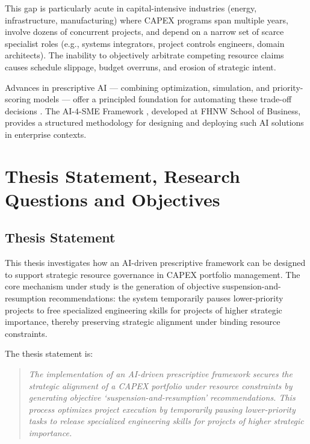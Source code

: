 This gap is particularly acute in capital-intensive industries (energy, infrastructure,
manufacturing) where CAPEX programs span multiple years, involve dozens of concurrent projects,
and depend on a narrow set of scarce specialist roles (e.g., systems integrators, project
controls engineers, domain architects). The inability to objectively arbitrate competing resource
claims causes schedule slippage, budget overruns, and erosion of strategic intent.

Advances in prescriptive AI — combining optimization, simulation, and priority-scoring models —
offer a principled foundation for automating these trade-off decisions \parencite{gartner2024hype}.
The AI-4-SME Framework \parencite{peter2025ai4sme}, developed at FHNW School of Business, provides a
structured methodology for designing and deploying such AI solutions in enterprise contexts.

\section{Thesis Statement, Research Questions and Objectives}
\label{sec:thesis_rq_objectives}

\subsection*{Thesis Statement}

This thesis investigates how an AI-driven prescriptive framework can be designed to support
strategic resource governance in CAPEX portfolio management. The core mechanism under study is
the generation of objective suspension-and-resumption recommendations: the system temporarily
pauses lower-priority projects to free specialized engineering skills for projects of higher
strategic importance, thereby preserving strategic alignment under binding resource constraints.

The thesis statement is:
\begin{quote}
  \textit{The implementation of an AI-driven prescriptive framework secures the strategic
  alignment of a CAPEX portfolio under resource constraints by generating objective
  `suspension-and-resumption' recommendations. This process optimizes project execution by
  temporarily pausing lower-priority tasks to release specialized engineering skills for
  projects of higher strategic importance.}
\end{quote}


